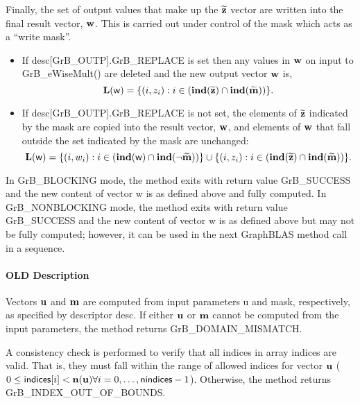 Finally, the set of output values that make up the ${\bf \widetilde{z}}$ 
vector are written into the final result vector, ${\bf w}$. 
This is carried out under control of the mask which acts as a ``write mask''.
\begin{itemize}
\item If {\sf desc[GrB\_OUTP].GrB\_REPLACE} is set then any values in ${\bf w}$ 
on input to {\sf GrB\_eWiseMult()} are deleted and the new output vector ${\bf w}$ is,
\[ \bold{L}({\sf w}) = \{(i,z_{i}) : i \in (\bold{ind}({\bf \widetilde{z}}) 
\cap \bold{ind}({\bf \widetilde{m}})) \}. \]

\item If {\sf desc[GrB\_OUTP].GrB\_REPLACE} is not set, the elements of ${\bf \widetilde{z}}$ indicated by 
the mask are copied into the result vector, ${\bf w}$, and elements of 
${\bf w}$ that fall outside the set indicated by the mask are unchanged:
\[ \bold{L}({\sf w}) = \{(i,w_{i}) : i \in (\bold{ind}({\bf \sf w}) 
\cap \bold{ind}(\neg {\bf \widetilde{m}})) \} \cup \{(i,z_{i}) : i \in 
(\bold{ind}({\bf \widetilde{z}}) \cap \bold{ind}({\bf \widetilde{m}})) \}. \]
\end{itemize}

In {\sf GrB\_BLOCKING} mode, the method exits with return value 
{\sf GrB\_SUCCESS} and the new content of vector {\sf w} is as defined above
and fully computed.  
In {\sf GrB\_NONBLOCKING} mode, the method exits with return value 
{\sf GrB\_SUCCESS} and the new content of vector {\sf w} is as defined above 
but may not be fully computed; however, it can be used in the next GraphBLAS 
method call in a sequence.


\paragraph{OLD Description}

Vectors ${\bf u}$ and ${\bf m}$ are computed from input
parameters {\sf u} and {\sf mask}, respectively, as specified by
descriptor {\sf desc}.  If either ${\bf u}$ or ${\bf m}$
cannot be computed from the input parameters, the method returns {\sf
GrB\_DOMAIN\_MISMATCH}.

A consistency check is performed to verify that all indices in array
{\sf indices} are valid. That is, they must fall within the range of allowed
indices for vector ${\bf u}$ ($0 \leq {\sf indices}[i] < \bold{n}({\bf u})
\forall i = 0,\ldots,{\sf nindices}-1$).  Otherwise, the method returns {\sf
GrB\_INDEX\_OUT\_OF\_BOUNDS}.

